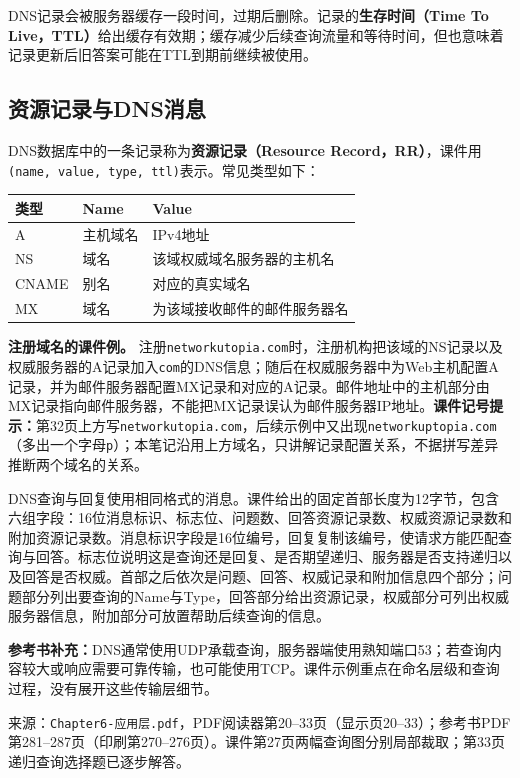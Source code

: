 DNS记录会被服务器缓存一段时间，过期后删除。记录的\textbf{生存时间（Time To Live，TTL）}给出缓存有效期；缓存减少后续查询流量和等待时间，但也意味着记录更新后旧答案可能在TTL到期前继续被使用。

\subsection{资源记录与DNS消息}
DNS数据库中的一条记录称为\textbf{资源记录（Resource Record，RR）}，课件用\texttt{(name, value, type, ttl)}表示。常见类型如下：
\begin{center}\begin{tabularx}{.96\textwidth}{lXX}\toprule
类型 & Name & Value \\\midrule
A & 主机域名 & IPv4地址 \\
NS & 域名 & 该域权威域名服务器的主机名 \\
CNAME & 别名 & 对应的真实域名 \\
MX & 域名 & 为该域接收邮件的邮件服务器名 \\\bottomrule\end{tabularx}\end{center}

\textbf{注册域名的课件例。} 注册\texttt{networkutopia.com}时，注册机构把该域的NS记录以及权威服务器的A记录加入\texttt{com}的DNS信息；随后在权威服务器中为Web主机配置A记录，并为邮件服务器配置MX记录和对应的A记录。邮件地址中的主机部分由MX记录指向邮件服务器，不能把MX记录误认为邮件服务器IP地址。\textbf{课件记号提示：}第32页上方写\texttt{networkutopia.com}，后续示例中又出现\texttt{networkuptopia.com}（多出一个字母\texttt{p}）；本笔记沿用上方域名，只讲解记录配置关系，不据拼写差异推断两个域名的关系。

DNS查询与回复使用相同格式的消息。课件给出的固定首部长度为12字节，包含六组字段：16位消息标识、标志位、问题数、回答资源记录数、权威资源记录数和附加资源记录数。消息标识字段是16位编号，回复复制该编号，使请求方能匹配查询与回答。标志位说明这是查询还是回复、是否期望递归、服务器是否支持递归以及回答是否权威。首部之后依次是问题、回答、权威记录和附加信息四个部分；问题部分列出要查询的Name与Type，回答部分给出资源记录，权威部分可列出权威服务器信息，附加部分可放置帮助后续查询的信息。

\textbf{参考书补充：}DNS通常使用UDP承载查询，服务器端使用熟知端口53；若查询内容较大或响应需要可靠传输，也可能使用TCP。课件示例重点在命名层级和查询过程，没有展开这些传输层细节。

\annotationarea[4]
\small 来源：\texttt{Chapter6-应用层.pdf}，PDF阅读器第20--33页（显示页20--33）；参考书PDF第281--287页（印刷第270--276页）。课件第27页两幅查询图分别局部裁取；第33页递归查询选择题已逐步解答。\normalsize

